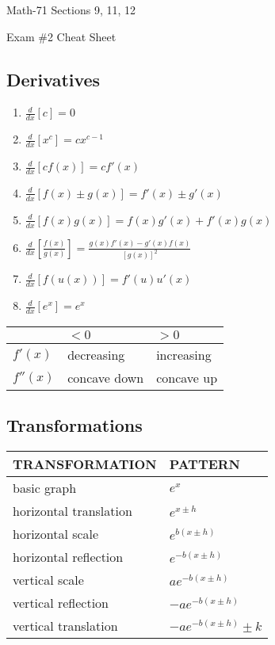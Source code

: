 \documentclass[letterpaper,12pt,fleqn]{article}
\begin{document}
\begin{center}
  \large
  Math-71 Sections 9, 11, 12

  \Large
  Exam \#2 Cheat Sheet
\end{center}

\vspace{0.25in}

\subsection*{Derivatives}

\begin{minipage}{3.5in}
  \begin{enumerate}
  \item \(\frac{d}{dx}[c]=0\)
  \item \(\frac{d}{dx}[x^c]=cx^{c-1}\)
  \item \(\frac{d}{dx}[cf(x)]=cf'(x)\)
  \item \(\frac{d}{dx}[f(x)\pm g(x)]=f'(x)\pm g'(x)\)
  \item \(\frac{d}{dx}[f(x)g(x)]=f(x)g'(x)+f'(x)g(x)\)
  \item \(\frac{d}{dx}\left[\frac{f(x)}{g(x)}\right]=\frac{g(x)f'(x)-g'(x)f(x)}{[g(x)]^2}\)
  \item \(\frac{d}{dx}[f(u(x))]=f'(u)u'(x)\)
  \item \(\frac{d}{dx}[e^x]=e^x\)
  \end{enumerate}
\end{minipage}
\begin{minipage}{3in}
  \begin{tabular}{|l|l|l|}
    \hline
    & \(<0\) & \(>0\) \\
    \hline
    \(f'(x)\) & decreasing & increasing \\
    \hline
    \(f''(x)\) & concave down & concave up \\
    \hline
  \end{tabular}
\end{minipage}

\subsection*{Transformations}

\begin{tabular}{|l|l|}
  \hline
  \textbf{TRANSFORMATION} & \textbf{PATTERN} \\
  \hline
  basic graph & \(e^x\) \\
  \hline
  horizontal translation & \(e^{x\pm h}\) \\
  \hline
  horizontal scale & \(e^{b(x\pm h)}\) \\
  \hline
  horizontal reflection & \(e^{-b(x\pm h)}\) \\
  \hline
  vertical scale & \(ae^{-b(x\pm h)}\) \\
  \hline
  vertical reflection & \(-ae^{-b(x\pm h)}\) \\
  \hline
  vertical translation & \(-ae^{-b(x\pm h)}\pm k\) \\
  \hline
\end{tabular}
\end{document}
